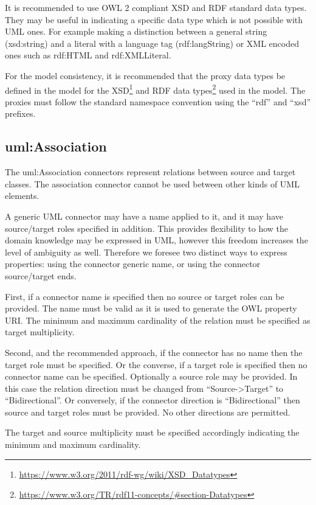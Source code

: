 	It is recommended to use OWL 2 compliant XSD and RDF standard data types. They may be useful in indicating a specific data type which is not possible with UML ones. For example making a distinction between a general string (xsd:string) and a literal with a language tag (rdf:langString) or XML encoded ones such as rdf:HTML and rdf:XMLLiteral.
	
	For the model consistency, it is recommended that the proxy data types be defined in the model for the XSD\footnote{\url{https://www.w3.org/2011/rdf-wg/wiki/XSD_Datatypes}} and RDF data types\footnote{\url{https://www.w3.org/TR/rdf11-concepts/\#section-Datatypes}} used in the model. The proxies must follow the standard namespace convention using the ``rdf'' and ``xsd'' prefixes.

	\subsection{uml:Association}
	\label{sec:association}	
	
	The uml:Association connectors represent relations between source and target classes. The association connector cannot be used between other kinds of UML elements.  
	
	A generic UML connector may have a name applied to it, and it may have source/target roles specified in addition.  This provides flexibility to how the domain knowledge may be expressed in UML, however this freedom increases the level of ambiguity as well. Therefore we foresee two distinct ways to express properties: using the connector generic name, or using the connector source/target ends. 
	
	First, if a connector name is specified then no source or target roles can be provided. The name must be valid as it is used to generate the OWL property URI. The minimum and maximum cardinality of the relation must be specified as target multiplicity. 
	
	Second, and the recommended approach, if the connector has no name then the target role must be specified. Or the converse, if a target role is specified then no connector name can be specified. Optionally a source role may be provided. In this case the relation direction must be changed from ``Source->Target'' to ``Bidirectional''. Or conversely, if the connector direction is ``Bidirectional'' then source and target roles must be provided. No other directions are permitted.
	
	The target and source multiplicity must be specified accordingly indicating the minimum and maximum cardinality. 
	
